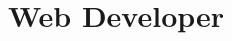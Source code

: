 \documentclass[11pt,a4paper,sans]{moderncv} %
\title{Web Developer}
\begin{document}


%
%
%
%
%


\makecvtitle %


%

%
\end{document}
